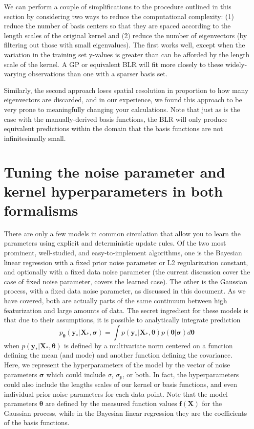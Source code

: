 \documentclass{article}
\begin{document}
We can perform a couple of simplifications to the procedure outlined in this section by considering two ways to reduce the computational complexity: (1) reduce the number of basis centers so that they are spaced according to the length scales of the original kernel and (2) reduce the number of eigenvectors (by filtering out those with small eigenvalues). The first works well, except when the variation in the training set y-values is greater than can be afforded by the length scale of the kernel. A GP or equivalent BLR will fit more closely to these widely-varying observations than one with a sparser basis set. 

Similarly, the second approach loses spatial resolution in proportion to how many eigenvectors are discarded, and in our experience, we found this approach to be very prone to meaningfully changing your calculations. Note that just as is the case with the manually-derived basis functions, the BLR will only produce equivalent predictions within the domain that the basis functions are not infinitesimally small.

\section{Tuning the noise parameter and kernel hyperparameters in both formalisms}\label{sec:hyperparameter_tuning}

There are only a few models in common circulation that allow you to learn the parameters using explicit and deterministic update rules. Of the two most prominent, well-studied, and easy-to-implement algorithms, one is the Bayesian linear regression with a fixed prior noise parameter or L2 regularization constant, and optionally with a fixed data noise parameter (the current discussion cover the case of fixed noise parameter, \cite{KoyoteScience} covers the learned case). The other is the Gaussian process, with a fixed data noise parameter, as discussed in this document. As we have covered, both are actually parts of the same continuum between high featurization and large amounts of data.  The secret ingredient for these models is that due to their assumptions, it is possible to analytically integrate prediction 
\begin{equation}
    p_{\boldsymbol{\theta}}(\mathbf{y}_\ast|\mathbf{X}_\ast,\boldsymbol{\sigma}) = \int p(\mathbf{y}_\ast|\mathbf{X}_\ast,\boldsymbol{\theta})p(\boldsymbol{\theta}|\boldsymbol{\sigma})d\boldsymbol{\theta}
\end{equation}when $p(\mathbf{y}_\ast|\mathbf{X}_\ast,\boldsymbol{\theta})$ is defined by a multivariate norm centered on a function defining the mean (and mode) and another function defining the covariance. Here, we represent the hyperparameters of the model by the vector of noise parameters $\boldsymbol{\sigma}$ which could include $\sigma$, $\sigma_p$, or both. In fact, the hyperparameters could also include the lengths scales of our kernel or basis functions, and even individual prior noise parameters for each data point. Note that the model parameters $\boldsymbol{\theta}$ are defined by the measured function values $\mathbf{f}(\mathbf{X})$ for the Gaussian process, while in the Bayesian linear regression they are the coefficients of the basis functions.  
\end{document}
